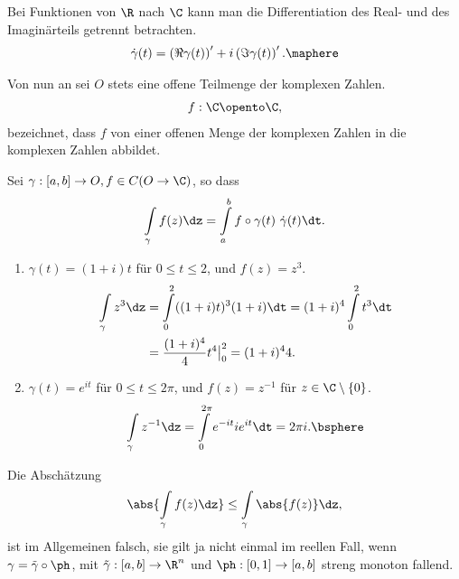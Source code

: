\begin{bemn}
Bei Funktionen von $\R$ nach $\C$ kann man die Differentiation des Real- und
des Imaginärteils getrennt betrachten.
\begin{align*}
\dot{\gamma}(t) = \left(\Re \gamma(t) \right)' + i\left(\Im \gamma(t)
\right)'.\maphere
\end{align*}
\end{bemn}

\begin{bemn}[Vereinbarung]
Von nun an sei $O$ stets eine offene Teilmenge der komplexen Zahlen.
\begin{align*}
f:\C\opento \C,
\end{align*}
bezeichnet, dass $f$ von einer offenen Menge der komplexen
Zahlen in die komplexen Zahlen abbildet.
\end{bemn}

\begin{bsp}
\label{prop:2.13}
Sei $\gamma:[a,b]\to O, f\in C(O\to\C)$, so dass
\begin{align*}
\int\limits_\gamma f(z)\dz = \int\limits_a^b f\circ \gamma(t)\
\dot{\gamma}(t)\dt.
\end{align*}
\begin{enumerate}
  \item $\gamma(t) = (1+i)t$ für $0\le t\le 2$, und $f(z) = z^3$.
  \begin{align*}
  \int\limits_\gamma z^3\dz &= \int\limits_0^2 ((1+i)t)^3(1+i) \dt
  = (1+i)^4\int\limits_0^2 t^3 \dt \\
  &= \frac{(1+i)^4}{4}t^4\big|_0^2 = (1+i)^44.
  \end{align*}
  \item $\gamma(t) = e^{it}$ für $0\le t\le 2\pi$, und $f(z) = z^{-1}$ für 
  $z\in\C\setminus\{ 0\}$.
  \begin{align*}
  \int\limits_\gamma z^{-1}\dz = \int\limits_0^{2\pi}e^{-it}ie^{it} \dt =
  2\pi i.\bsphere
  \end{align*}
\end{enumerate}
\end{bsp}

\begin{bemn}
Die Abschätzung
\begin{align*}
\abs{\int\limits_\gamma f(z) \dz} \le \int\limits_\gamma \abs{f(z)}\dz,
\end{align*}
ist im Allgemeinen falsch, sie gilt ja nicht einmal im reellen Fall, wenn
$\gamma = \tilde{\gamma}\circ\ph$, mit $\tilde{\gamma}: [a,b]\to \R^n$ und
$\ph:[0,1]\to[a,b]$ streng monoton fallend.\maphere
\end{bemn}

